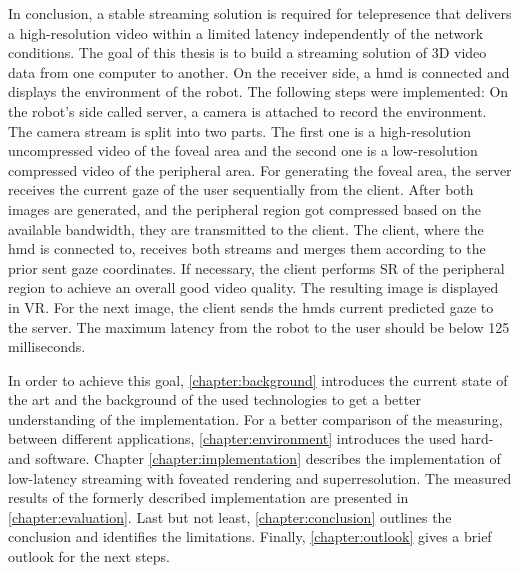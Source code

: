 \par
In conclusion, a stable streaming solution is required for telepresence that delivers a high-resolution video within a limited latency independently of the network conditions. The goal of this thesis is to build a streaming solution of 3D video data from one computer to another. On the receiver side, a \gls{hmd} is connected and displays the environment of the robot. The following steps were implemented: On the robot’s side called server, a camera is attached to record the environment. The camera stream is split into two parts. The first one is a high-resolution uncompressed video of the foveal area and the second one is a low-resolution compressed video of the peripheral area. For generating the foveal area, the server receives the current gaze of the user sequentially from the client. After both images are generated, and the peripheral region got compressed based on the available bandwidth, they are transmitted to the client. The client, where the \gls{hmd} is connected to, receives both streams and merges them according to the prior sent gaze coordinates. If necessary, the client performs SR of the peripheral region to achieve an overall good video quality. The resulting image is displayed in VR. For the next image, the client sends the \glspl{hmd} current predicted gaze to the server. The maximum latency from the robot to the user should be below 125 milliseconds.
\par
In order to achieve this goal, \autoref{chapter:background} introduces the current state of the art and the background of the used technologies to get a better understanding of the implementation. For a better comparison of the measuring, between different applications, \autoref{chapter:environment} introduces the used hard- and software. Chapter \ref{chapter:implementation} describes the implementation of low-latency streaming with foveated rendering and superresolution. The measured results of the formerly described implementation are presented in \autoref{chapter:evaluation}. Last but not least, \autoref{chapter:conclusion} outlines the conclusion and identifies the limitations. Finally, \autoref{chapter:outlook} gives a brief outlook for the next steps.